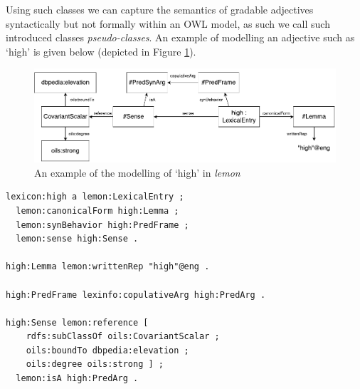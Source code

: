 \documentclass[11pt]{article}
\begin{document}
Using such classes we can capture the semantics of gradable adjectives 
syntactically but not formally within an OWL model, as such we call such 
introduced classes \emph{pseudo-classes}. An example of modelling an adjective 
such as `high' is given below (depicted in Figure \ref{high-example}).

\begin{figure}
\includegraphics[width=\textwidth]{high-example}
\caption{An example of the modelling of `high' in \emph{lemon}\label{high-example}}
\end{figure}

\begin{small}\begin{verbatim}
lexicon:high a lemon:LexicalEntry ;
  lemon:canonicalForm high:Lemma ;
  lemon:synBehavior high:PredFrame ;
  lemon:sense high:Sense .

high:Lemma lemon:writtenRep "high"@eng .

high:PredFrame lexinfo:copulativeArg high:PredArg .

high:Sense lemon:reference [
    rdfs:subClassOf oils:CovariantScalar ;
    oils:boundTo dbpedia:elevation ;
    oils:degree oils:strong ] ;
  lemon:isA high:PredArg .
\end{verbatim}\end{small}

\end{document}
